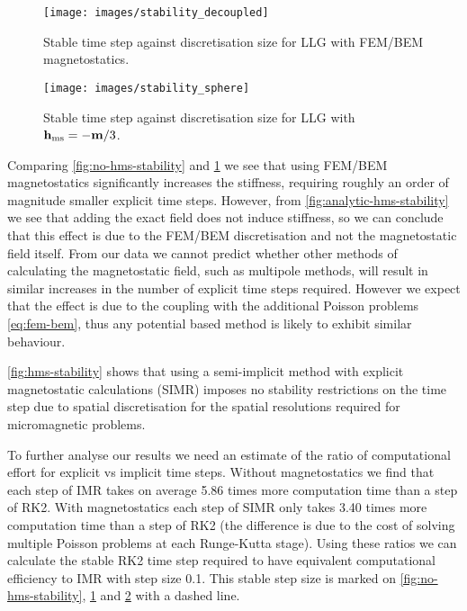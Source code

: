 \documentclass[10pt, final, conference, transmag]{IEEEtran}
\renewcommand{\figpos}{t!}
\newcommand{\figsize}{3.5in}
\begin{document}
\begin{figure}[\figpos]
  \centering
  \texttt{[image: images/stability\_decoupled]}
  \caption{Stable time step against discretisation size for LLG with FEM/BEM magnetostatics.}
  \label{fig:hms-stability}
\end{figure}


\begin{figure}[\figpos]
  \centering
  \texttt{[image: images/stability\_sphere]}
  \caption{Stable time step against discretisation size for LLG with $\mathbf{h}_{\text{ms}} = - \mathbf{m} / 3$.
  }
  \label{fig:analytic-hms-stability}
\end{figure}

Comparing \autoref{fig:no-hms-stability} and \ref{fig:hms-stability} we see that using FEM/BEM magnetostatics significantly increases the stiffness, requiring roughly an order of magnitude smaller explicit time steps.
However, from \autoref{fig:analytic-hms-stability} we see that adding the exact field does not induce stiffness, so we can conclude that this effect is due to the FEM/BEM discretisation and not the magnetostatic field itself.
From our data we cannot predict whether other methods of calculating the magnetostatic field, such as multipole methods, will result in similar increases in the number of explicit time steps required.
However we expect that the effect is due to the coupling with the additional Poisson problems \iftransmagpaper\eqref{eq:fem-bem}\fi, thus any potential based method is likely to exhibit similar behaviour.

\autoref{fig:hms-stability} shows that using a semi-implicit method with explicit magnetostatic calculations (SIMR) imposes no stability restrictions on the time step due to spatial discretisation for the spatial resolutions required for micromagnetic problems.

To further analyse our results we need an estimate of the ratio of computational effort for explicit vs implicit time steps. Without magnetostatics we find that each step of IMR takes on average 5.86 times more computation time than a step of RK2. With magnetostatics each step of SIMR only takes 3.40 times more computation time than a step of RK2 (the difference is due to the cost of solving multiple Poisson problems at each Runge-Kutta stage). Using these ratios we can calculate the stable RK2 time step required to have equivalent computational efficiency to IMR with step size 0.1. This stable step size is marked on \autoref{fig:no-hms-stability}, \ref{fig:hms-stability} and \ref{fig:analytic-hms-stability} with a dashed line.
\end{document}
